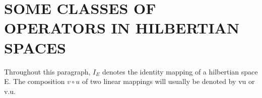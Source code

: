 \section{SOME CLASSES OF OPERATORS IN HILBERTIAN SPACES}

Throughout this paragraph, \(I_{E}\) denotes the identity mapping of a hilbertian space E. The composition \(v \circ u\) of two linear mappings will usually be denoted by vu or v.u.

